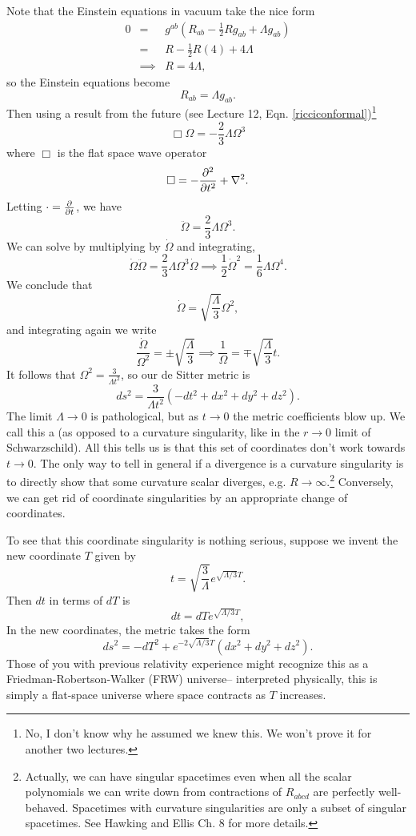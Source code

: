 Note that the Einstein equations in vacuum take the nice form
\begin{eqnarray*}
0&=& g^{ab}(R_{ab}-\frac{1}{2} R g_{ab}+\Lambda g_{ab})\\
&=&R -\frac{1}{2} R (4) +4 \Lambda\\
&\implies& R=4\Lambda,
\end{eqnarray*}
so the Einstein equations become
$$R_{ab}=\Lambda g_{ab}.$$
Then using a result from the future (see Lecture 12, Eqn. \ref{ricciconformal})\footnote{No, I don't know why he assumed we knew this. We won't prove it for another two lectures.}
$$\Box \Omega = -\frac{2}{3} \Lambda \Omega^3$$
where $\Box$ is the flat space wave operator
$$\Box = -\frac{\p^2}{\p t^2}+\nabla^2.$$
Letting $\cdot =\P{}{t}$, we have
$$\ddot \Omega = \frac{2}{3} \Lambda \Omega^3.$$
We can solve by multiplying by $\dot \Omega$ and integrating,
$$\dot \Omega \ddot \Omega = \frac{2}{3} \Lambda \Omega^3 \dot \Omega \implies \frac{1}{2} \dot \Omega^2 = \frac{1}{6} \Lambda \Omega^4.$$
We conclude that
$$\dot \Omega = \sqrt{\frac{\Lambda}{3}} \Omega^2,$$
and integrating again we write
$$\frac{\dot \Omega}{\Omega^2}=\pm\sqrt{\frac{\Lambda}{3}} \implies \frac{1}{\Omega}=\mp \sqrt{\frac{\Lambda}{3}}t.$$
It follows that $\Omega^2=\frac{3}{\Lambda t^2}$, so our de Sitter metric is
$$ds^2 = \frac{3}{\Lambda t^2}(-dt^2+dx^2 +dy^2 +dz^2).$$
The limit $\Lambda \to 0$ is pathological, but as $t\to 0$ the metric coefficients blow up. We call this a  (as opposed to a curvature singularity, like in the $r\to 0$ limit of Schwarzschild). All this tells us is that this set of coordinates don't work towards $t\to 0$. The only way to tell in general if a divergence is a curvature singularity is to directly show that some curvature scalar diverges, e.g. $R\to \infty.$\footnote{Actually, we can have singular spacetimes even when all the scalar polynomials we can write down from contractions of $R_{abcd}$ are perfectly well-behaved. Spacetimes with curvature singularities are only a subset of singular spacetimes. See Hawking and Ellis Ch. 8 for more details.} Conversely, we can get rid of coordinate singularities by an appropriate change of coordinates.

To see that this coordinate singularity is nothing serious, suppose we invent the new coordinate $T$ given by
$$t=\sqrt{\frac{3}{\Lambda}} e^{\sqrt{\Lambda/3} T}.$$
Then $dt$ in terms of $dT$ is
$$dt=dT e^{\sqrt{\Lambda/3}T},$$
In the new coordinates, the metric takes the form
$$ds^2 = -dT^2 + e^{-2\sqrt{\Lambda/3}T}(dx^2+dy^2+dz^2).$$
Those of you with previous relativity experience might recognize this as a Friedman-Robertson-Walker (FRW) universe-- interpreted physically, this is simply a flat-space universe where space contracts as $T$ increases.

